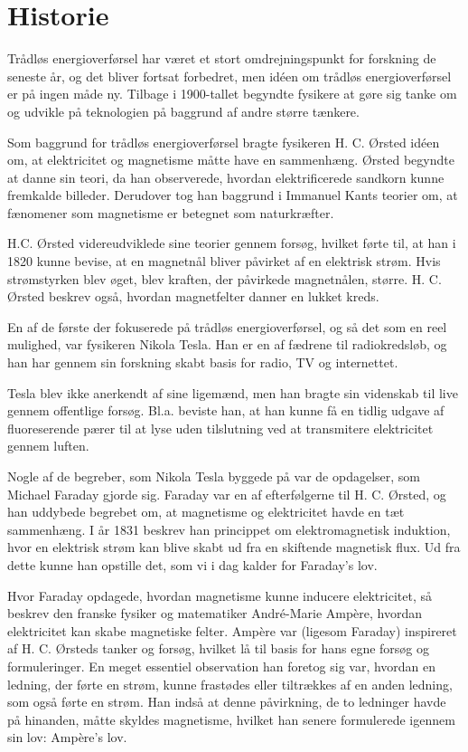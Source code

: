 \chapter{Historie}
Trådløs energioverførsel har været et stort omdrejningspunkt for forskning de seneste år, og det bliver fortsat forbedret, men idéen om trådløs energioverførsel er på ingen måde ny. Tilbage i 1900-tallet begyndte fysikere at gøre sig tanke om og udvikle på teknologien på baggrund af andre større tænkere.

Som baggrund for trådløs energioverførsel bragte fysikeren H. C. Ørsted idéen om, at elektricitet og magnetisme måtte have en sammenhæng. Ørsted begyndte at danne sin teori, da han observerede, hvordan elektrificerede sandkorn kunne fremkalde billeder. Derudover tog han baggrund i Immanuel Kants teorier om, at fænomener som magnetisme er betegnet som naturkræfter.

H.C. Ørsted videreudviklede sine teorier gennem forsøg, hvilket førte til, at han i 1820 kunne bevise, at en magnetnål bliver påvirket af en elektrisk strøm. Hvis strømstyrken blev øget, blev kraften, der påvirkede magnetnålen, større. H. C. Ørsted beskrev også, hvordan magnetfelter danner en lukket kreds.

En af de første der fokuserede på trådløs energioverførsel, og så det som en reel mulighed, var fysikeren Nikola Tesla. Han er en af fædrene til radiokredsløb, og han har gennem sin forskning skabt basis for radio, TV og internettet.

Tesla blev ikke anerkendt af sine ligemænd, men han bragte sin videnskab til live gennem offentlige forsøg. Bl.a. beviste han, at han kunne få en tidlig udgave af fluoreserende pærer til at lyse uden tilslutning ved at transmitere elektricitet gennem luften.

Nogle af de begreber, som Nikola Tesla byggede på var de opdagelser, som Michael Faraday gjorde sig. Faraday var en af efterfølgerne til H. C. Ørsted, og han uddybede begrebet om, at magnetisme og elektricitet havde en tæt sammenhæng. I år 1831 beskrev han princippet om elektromagnetisk induktion, hvor en elektrisk strøm kan blive skabt ud fra en skiftende magnetisk flux. Ud fra dette kunne han opstille det, som vi i dag kalder for Faraday's lov.

Hvor Faraday opdagede, hvordan magnetisme kunne inducere elektricitet, så beskrev den franske fysiker og matematiker André-Marie Ampère, hvordan elektricitet kan skabe magnetiske felter. Ampère var (ligesom Faraday) inspireret af H. C. Ørsteds tanker og forsøg, hvilket lå til basis for hans egne forsøg og formuleringer. En meget essentiel observation han foretog sig var, hvordan en ledning, der førte en strøm, kunne frastødes eller tiltrækkes af en anden ledning, som også førte en strøm. Han indså at denne påvirkning, de to ledninger havde på hinanden, måtte skyldes magnetisme, hvilket han senere formulerede igennem sin lov: Ampère's lov.

